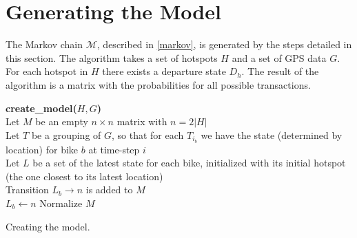 \section{Generating the Model}\label{sec:generatemarkov}
The Markov chain $\mathcal{M}$, described in \cref{markov}, is generated by the steps detailed in this section.
The algorithm takes a set of hotspots $H$ and a set of GPS data $G$. For each hotspot in $H$ there exists a departure state $D_h$.
The result of the algorithm is a matrix with the probabilities for all possible transactions.

\begin{algorithm}[H]
\SetAlgoNoEnd
\textbf{create\_model($H, G$)} \\
Let $M$ be an empty $n \times n$ matrix with $n = 2|H|$ \\
Let $T$ be a grouping of $G$, so that for each $T_{i_b}$ we have the state (determined by location) for bike $b$ at time-step $i$\\
Let $L$ be a set of the latest state for each bike, initialized with its initial hotspot (the one closest to its latest location)\\
  {
    {
    Transition $L_b \rightarrow n$ is added to $M$\\
     $L_b \leftarrow n$}}
Normalize $M$\\
\caption{Creating the model.}
\label{markov:create_model}
\end{algorithm}